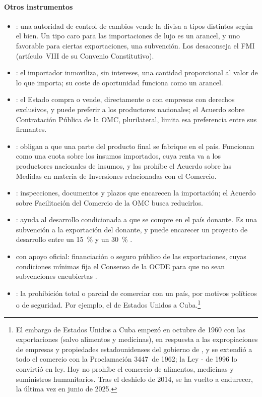 \documentclass[11pt]{article}
\begin{document}
\paragraph{Otros instrumentos}

\begin{itemize}
\item {}: una autoridad de control de cambios vende la divisa a tipos distintos según el bien. Un tipo caro para las importaciones de lujo es un arancel, y uno favorable para ciertas exportaciones, una subvención. Los desaconseja el FMI (artículo~VIII de su Convenio Constitutivo).
\item {}: el importador inmoviliza, sin intereses, una cantidad proporcional al valor de lo que importa; su coste de oportunidad funciona como un arancel.
\item {}: el Estado compra o vende, directamente o con empresas con derechos exclusivos, y puede preferir a los productores nacionales; el Acuerdo sobre Contratación Pública de la OMC, plurilateral, limita esa preferencia entre sus firmantes.
\item {}: obligan a que una parte del producto final se fabrique en el país. Funcionan como una cuota sobre los insumos importados, cuya renta va a los productores nacionales de insumos, y las prohíbe el Acuerdo sobre las Medidas en materia de Inversiones relacionadas con el Comercio.
\item {}: inspecciones, documentos y plazos que encarecen la importación; el Acuerdo sobre Facilitación del Comercio de la OMC busca reducirlos.
\item {}: ayuda al desarrollo condicionada a que se compre en el país donante. Es una subvención a la exportación del donante, y puede encarecer un proyecto de desarrollo entre un 15~\% y un 30~\%\nocite{OCDE2018AyudaDesligada,Jepma1991Tying} .
\item {} con apoyo oficial: financiación o seguro público de las exportaciones, cuyas condiciones mínimas fija el Consenso de la OCDE para que no sean subvenciones encubiertas .
\item {}: la prohibición total o parcial de comerciar con un país, por motivos políticos o de seguridad. Por ejemplo, el de Estados Unidos a Cuba.\footnote{El embargo de Estados Unidos a Cuba empezó en octubre de 1960 con las exportaciones (salvo alimentos y medicinas), en respuesta a las expropiaciones de empresas y propiedades estadounidenses del gobierno de , y se extendió a todo el comercio con la Proclamación 3447~de 1962\nocite{Kennedy1962Proclamacion3447}; la Ley - de 1996 lo convirtió en ley. Hoy no prohíbe el comercio de alimentos, medicinas y suministros humanitarios. Tras el deshielo de 2014, se ha vuelto a endurecer, la última vez en junio de 2025\nocite{CasaBlanca2025Cuba}.}

\end{itemize}
\end{document}
